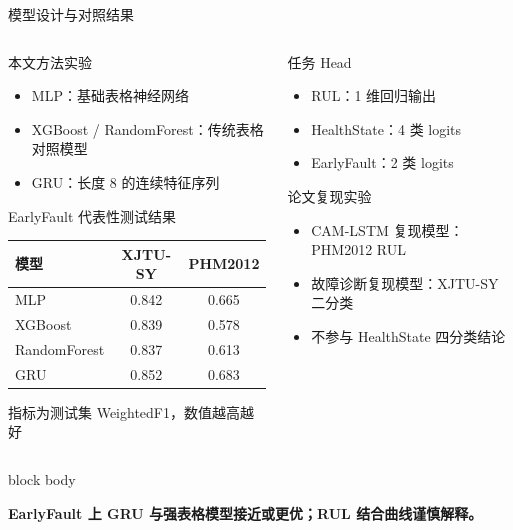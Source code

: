 \documentclass[aspectratio=169,11pt]{ctexbeamer}
\newcommand{\takeaway}[1]{%
  \vspace{0.18em}
  \begin{beamercolorbox}[wd=\linewidth,rounded=true,sep=0.58em]{block body}
    \parbox{\dimexpr\linewidth-1.16em\relax}{\raggedright\small\color{phmblue}\bfseries #1}
  \end{beamercolorbox}
}
\newcommand{\smallcap}[1]{%
  {\scriptsize\color{phmgray}#1}
}
\begin{document}
\begin{frame}[t]{模型设计与对照结果}
  \begin{columns}[T,onlytextwidth]
    \begin{column}{0.50\textwidth}
      \begin{block}{本文方法实验}
        \begin{itemize}
          \item MLP：基础表格神经网络
          \item XGBoost / RandomForest：传统表格对照模型
          \item GRU：长度 8 的连续特征序列
        \end{itemize}
      \end{block}
      \begin{block}{EarlyFault 代表性测试结果}
        \scriptsize
        \begin{tabularx}{\linewidth}{lCC}
          \toprule
          模型 & XJTU-SY & PHM2012 \\
          \midrule
          MLP & 0.842 & 0.665 \\
          XGBoost & 0.839 & 0.578 \\
          RandomForest & 0.837 & 0.613 \\
          GRU & 0.852 & 0.683 \\
          \bottomrule
        \end{tabularx}
        \smallcap{指标为测试集 WeightedF1，数值越高越好}
      \end{block}
    \end{column}
    \begin{column}{0.46\textwidth}
      \begin{block}{任务 Head}
        \begin{itemize}
          \item RUL：1 维回归输出
          \item HealthState：4 类 logits
          \item EarlyFault：2 类 logits
        \end{itemize}
      \end{block}
      \begin{block}{论文复现实验}
        \begin{itemize}
          \item CAM-LSTM 复现模型：PHM2012 RUL
          \item 故障诊断复现模型：XJTU-SY 二分类
          \item 不参与 HealthState 四分类结论
        \end{itemize}
      \end{block}
    \end{column}
  \end{columns}

  \takeaway{EarlyFault 上 GRU 与强表格模型接近或更优；RUL 结合曲线谨慎解释。}
\end{frame}
\end{document}
